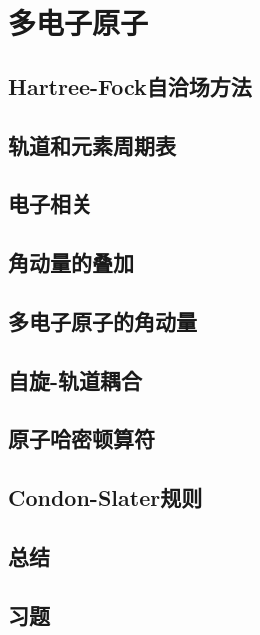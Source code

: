 \chapter{多电子原子}
\section{Hartree-Fock自洽场方法}

\section{轨道和元素周期表}

\section{电子相关}

\section{角动量的叠加}

\section{多电子原子的角动量}

\section{自旋-轨道耦合}

\section{原子哈密顿算符}

\section{Condon-Slater规则}

\section*{总结}

\section*{习题}
